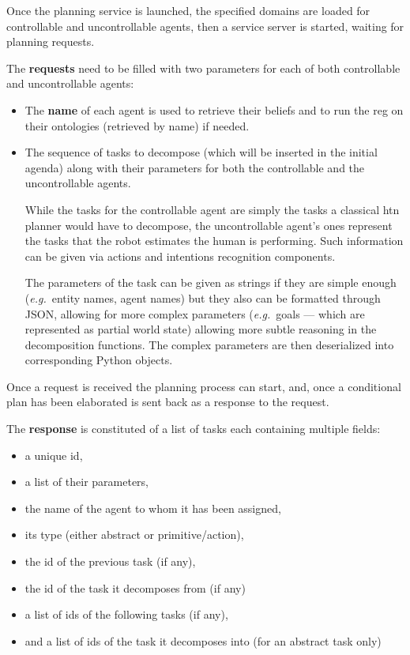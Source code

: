 \documentclass[a4paper,11pt,twoside]{StyleThese}
\begin{document}
Once the planning service is launched, the specified domains are loaded for controllable and uncontrollable agents, then a service server is started, waiting for planning requests. 

The \textbf{requests} need to be filled with two parameters for each of both controllable and uncontrollable agents:
\begin{itemize}
\item The \textbf{name} of each agent is used to retrieve their beliefs and to run the \acrshort{reg} on their ontologies (retrieved by name) if needed.

\item The sequence of tasks to decompose (which will be inserted in the initial agenda) along with their parameters for both the controllable and the uncontrollable agents. 

While the tasks for the controllable agent are simply the tasks a classical \acrshort{htn} planner would have to decompose, the uncontrollable agent's ones represent the tasks that the robot estimates the human is performing. Such information can be given via actions and intentions recognition components. 

The parameters of the task can be given as strings if they are simple enough (\textit{e.g.}~entity names, agent names) but they also can be formatted through JSON, allowing for more complex parameters (\textit{e.g.}~goals --- which are represented as partial world state) allowing more subtle reasoning in the decomposition functions. The complex parameters are then deserialized into corresponding Python objects.
\end{itemize}

Once a request is received the planning process can start, and, once a conditional plan has been elaborated is sent back as a response to the request. 

The \textbf{response} is constituted of a list of tasks each containing multiple fields: 
\begin{itemize}
\item a unique id,

\item a list of their parameters,

\item the name of the agent to whom it has been assigned,

\item its type (either abstract or primitive/action),

\item the id of the previous task (if any),

\item the id of the task it decomposes from (if any)

\item a list of ids of the following tasks (if any),

\item and a list of ids of the task it decomposes into (for an abstract task only)
\end{itemize}
\end{document}
